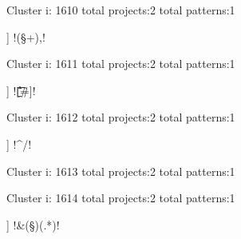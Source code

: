 Cluster i: 1610
total projects:2
total patterns:1
\begin{multicols}{1}
\begin{description}[noitemsep,topsep=0pt]
\item [[2] ] \cverb!(\S+)\s*,\s*!
\end{description}
\end{multicols}







Cluster i: 1611
total projects:2
total patterns:1
\begin{multicols}{1}
\begin{description}[noitemsep,topsep=0pt]
\item [[2] ] \cverb![\t\b\r\f#]!
\end{description}
\end{multicols}







Cluster i: 1612
total projects:2
total patterns:1
\begin{multicols}{1}
\begin{description}[noitemsep,topsep=0pt]
\item [[2] ] \cverb!^\s*/\*\*\s!
\end{description}
\end{multicols}







Cluster i: 1613
total projects:2
total patterns:1
\begin{multicols}{1}
\begin{description}[noitemsep,topsep=0pt]
\item [[2] ] \cverb!^<([\w\.]+)>$!
\end{description}
\end{multicols}







Cluster i: 1614
total projects:2
total patterns:1
\begin{multicols}{1}
\begin{description}[noitemsep,topsep=0pt]
\item [[2] ] \cverb!&(\S*)\s*(.*)!
\end{description}
\end{multicols}








